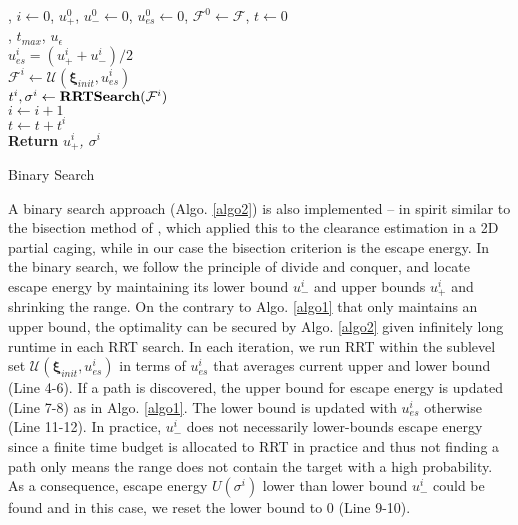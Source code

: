 \documentclass[conference]{IEEEtran}
\newcommand{\bxi}{\boldsymbol{\xi}}
\begin{document}
\begin{algorithm}[h]
	, $i \gets 0$, $u_{+}^{0}$, $u_{-}^{0} \gets 0$, $u_{es}^{0} \gets 0$, $\mathcal{F}^{0} \gets \mathcal{F}$, $t \gets 0$\\
	, $t_{max}$, $u_{\epsilon}$\\
	
	{
		$u_{es}^{i} = (u_{+}^{i} + u_{-}^{i}) / 2$ \\
		$\mathcal{F}^{i} \gets \mathcal{U}(\bxi_{init}, u_{es}^{i})$ \\
		$t^i, \sigma^i \gets \bold{RRTSearch} (\mathcal{F}^{i})$  \\
		$i \gets i + 1$ \\
		$t \gets t + t^i$ \\
	} 
	\textbf{Return} \textit{{$u_+^{i}$, $\sigma^{i}$}}
	\caption{Binary Search}
	\label{algo2}
\end{algorithm}

A binary search approach (Algo. \ref{algo2}) is also implemented -- in spirit similar to the bisection method of \cite{b11}, which applied this to the clearance estimation in a 2D partial caging, while in our case the bisection criterion is the escape energy.
In the binary search, we follow the principle of divide and conquer, and locate escape energy by maintaining its lower bound $u_{-}^i$ and upper bounds $u_{+}^i$ and shrinking the range.
On the contrary to Algo. \ref{algo1} that only maintains an upper bound, the optimality can be secured by Algo. \ref{algo2} given infinitely long runtime in each RRT search.
In each iteration, we run RRT within the sublevel set $\mathcal{U}(\bxi_{init}, u_{es}^{i})$ in terms of $u_{es}^{i}$ that averages current upper and lower bound (Line 4-6).
If a path is discovered, the upper bound for escape energy is updated (Line 7-8) as in Algo. \ref{algo1}. The lower bound is updated with $u_{es}^i$ otherwise (Line 11-12).
In practice, $u_-^i$ does not necessarily lower-bounds escape energy since a finite time budget is allocated to RRT in practice and thus not finding a path only means the range does not contain the target with a high probability.  
As a consequence, escape energy $U(\sigma^i)$ lower than lower bound $u_-^i$ could be found and in this case, we reset the lower bound to $0$ (Line 9-10).
\end{document}
